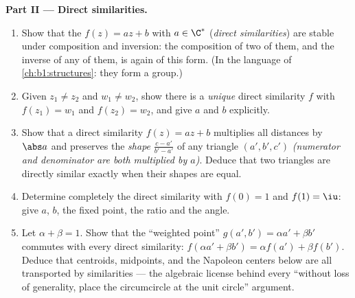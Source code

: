 \begin{problem}
\medskip
\noindent\textbf{Part II --- Direct similarities.}
\begin{enumerate}[resume]
  \item Show that the  $f(z) = az + b$ with $a \in \C^*$
        (\emph{direct similarities}) are stable under composition
        and inversion: the composition of two of them, and the
        inverse of any of them, is again of this form. (In the
        language of \cref{ch:b1:structures}: they form a group.)
  \item Given $z_1 \neq z_2$ and $w_1 \neq w_2$, show there is a
        \emph{unique} direct similarity $f$ with $f(z_1) = w_1$ and
        $f(z_2) = w_2$, and give $a$ and $b$ explicitly.
  \item Show that a direct similarity $f(z) = az + b$ multiplies
        all distances by $\abs a$ and preserves the \emph{shape}
        $\frac{c - a'}{b' - a'}$ of any triangle $(a', b', c')$
        \emph{(numerator and denominator are both multiplied by
        $a$)}. Deduce that two triangles are directly similar
        exactly when their shapes are equal.
  \item Determine completely the direct similarity with $f(0) = 1$
        and $f(1) = \iu$: give $a$, $b$, the fixed point, the ratio
        and the angle.
  \item Let $\alpha + \beta = 1$. Show that the ``weighted point''
        $g(a', b') = \alpha a' + \beta b'$ commutes with every
        direct similarity: $f(\alpha a' + \beta b') = \alpha f(a')
        + \beta f(b')$. Deduce that centroids, midpoints, and the
        Napoleon centers below are all transported by similarities
        --- the algebraic license behind every ``without loss of
        generality, place the circumcircle at the unit circle''
        argument.
\end{enumerate}


\end{problem}
